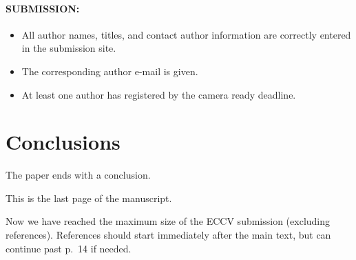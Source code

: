 \documentclass[runningheads]{llncs}
\begin{document}
\paragraph{SUBMISSION:}
\begin{itemize}
  \item All author names, titles, and contact author information are correctly entered in the submission site.
  \item The corresponding author e-mail is given.
  \item At least one author has registered by the camera ready deadline.
\end{itemize}


\section{Conclusions}
The paper ends with a conclusion. 


This is the last page of the manuscript.
\par\vfill\par
Now we have reached the maximum size of the ECCV \ECCVyear{} submission (excluding references).
References should start immediately after the main text, but can continue past p.~14 if needed.

%
%


\end{document}
